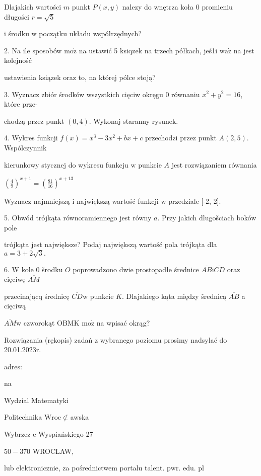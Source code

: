 \documentclass[a4paper,12pt]{article}
\begin{document}
Dlajakich wartości $m$ punkt $P(x,y)$ nalezy do wnętrza koła $0$ promieniu długości $r=\sqrt{5}$

$\mathrm{i}$ środku $\mathrm{w}$ początku układu współrzędnych?

2. Na ile sposobów $\mathrm{m}\mathrm{o}\dot{\mathrm{z}}$ na ustawić 5 ksiqzek na trzech półkach, jeś1i $\mathrm{w}\mathrm{a}\dot{\mathrm{z}}$ na jest kolejność

ustawienia ksiązek oraz to, na której pólce stoją?

3. Wyznacz zbiór środków wszystkich cięciw okręgu $0$ równaniu $x^{2}+y^{2}=16$, które prze-

chodzą przez punkt $(0,4)$. Wykonaj staranny rysunek.

4. Wykres funkcji $f(x)=x^{3}-3x^{2}+bx+c$ przechodzi przez punkt $A(2,5)$. Wspólczynnik

kierunkowy stycznej do wykresu funkcju $\mathrm{w}$ punkcie $A$ jest rozwiązaniem równania

$(\displaystyle \frac{4}{9})^{x+1}=(\frac{81}{16})^{x+13}$

Wyznacz najmniejszą $\mathrm{i}$ największą wartość funkcji $\mathrm{w}$ przedziale [-2, 2].

5. Obwód trójkąta równoramiennego jest równy $a$. Przy jakich dlugošciach boków pole

trójkąta jest największe? Podaj największą wartość pola trójkąta dla $a=3+2\sqrt{3}.$

6. $\mathrm{W}$ kole $0$ šrodku $O$ poprowadzono dwie prostopadłe średnice $\overline{AB}\mathrm{i}\overline{CD}$ oraz cięciwę $\overline{AM}$

przecinającq średnicę $\overline{CD}\mathrm{w}$ punkcie $K$. Dlajakiego kąta między šrednicą $\overline{AB}$ a cięciwą

$\overline{AM}\mathrm{w}$ czworokąt OBMK $\mathrm{m}\mathrm{o}\dot{\mathrm{z}}$ na wpisać okrąg?

Rozwiązania (rękopis) zadań z wybranego poziomu prosimy nadsylać do 20.01.2023r.

adres:

na

Wydzial Matematyki

Politechnika $\mathrm{W}\mathrm{r}\mathrm{o}\mathrm{c}\not\subset$awska

Wybrzez $\mathrm{e}$ Wyspiańskiego 27

$50-370$ WROCLAW,

lub elektronicznie, za pośrednictwem portalu talent. $\mathrm{p}\mathrm{w}\mathrm{r}$. edu. pl
\end{document}
